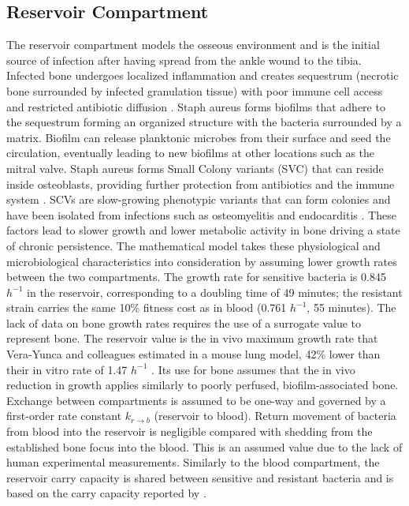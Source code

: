 \documentclass[utf8]{FrontiersinHarvard} %
\begin{document}
\subsection{Reservoir Compartment}
The reservoir compartment models the osseous environment and is the initial source of infection after having spread from the ankle wound to the tibia.
Infected bone undergoes localized inflammation and creates sequestrum (necrotic bone surrounded by infected granulation tissue)
with poor immune cell access and restricted antibiotic diffusion \citep{MomoduSavaliya2023}. Staph aureus forms biofilms that adhere
to the sequestrum forming an organized structure with the bacteria surrounded by a matrix.  Biofilm can release planktonic microbes from their
surface and seed the circulation, eventually leading to new biofilms at other locations such as the mitral valve.
Staph aureus forms Small Colony variants (SVC) that can reside inside osteoblasts, providing further protection
from antibiotics and the immune system \citep{Kahl2016SCV}. SCVs are slow-growing phenotypic variants that can form colonies and have been isolated
from infections such as osteomyelitis and endocarditis \citep{Kahl2016SCV}.  These factors lead to slower growth and lower metabolic activity
in bone driving a state of chronic persistence.  The mathematical model takes these physiological and microbiological characteristics
into consideration by assuming lower growth rates between the two compartments. The growth rate for sensitive bacteria is 0.845 $h^{-1}$ in the
reservoir, corresponding to a doubling time of 49 minutes; the resistant strain carries the same 10\% fitness cost as in blood
(0.761 $h^{-1}$, 55 minutes).  The lack of data on bone growth rates requires the use of a surrogate value to
represent bone.  The reservoir value is the in vivo maximum growth rate that Vera-Yunca and colleagues estimated
in a mouse lung model, 42\% lower than their in vitro rate of 1.47 $h^{-1}$ \citep{VeraYunca2025}. Its use for bone
assumes that the in vivo reduction in growth applies similarly to poorly perfused, biofilm-associated bone.
Exchange between compartments is assumed to be one-way and governed by a first-order rate constant $k_{r \to b}$ (reservoir to blood).
Return movement of bacteria from blood into the reservoir is negligible compared with shedding from the established bone focus into the blood.
This is an assumed value due to the lack of human experimental measurements.  Similarly to the blood compartment, the reservoir carry capacity is shared
between sensitive and resistant bacteria and is based on the carry capacity reported by \citet{VeraYunca2025}.
\end{document}
